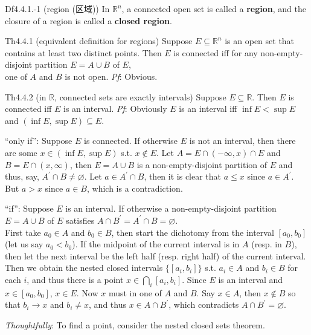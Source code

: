 \documentclass{article}
\begin{document}
\begin{Df}{Df4.4.1.-1 (region (区域))}
    In $\mathbb{R}^n$, a connected open set is called a \textbf{region}, and the closure of a region is called a \textbf{closed region}.
\end{Df}

\begin{Th}{Th4.4.1 (equivalent definition for regions)}
    Suppose $E\subseteq\mathbb{R}^n$ is an open set that contains at least two distinct points. Then $E$ is connected iff for any non-empty-disjoint partition $E = A\cup B$ of $E$, \\
    one of $A$ and $B$ is not open.
    \tcblower
    \textit{Pf}: Obvious.
\end{Th}

\begin{Th}{Th4.4.2 (in $\mathbb{R}$, connected sets are exactly intervals)}
    Suppose $E\subseteq\mathbb{R}$. Then $E$ is connected iff $E$ is an interval.
    \tcblower
    \textit{Pf}: Obviously \textcolor{Th}{$E$ is an interval iff $\inf E<\sup E$ and $(\inf E, \sup E)\subseteq E$}.
    \begin{compactenum}
        \item ``only if'': Suppose $E$ is connected. If otherwise $E$ is not an interval, then there are some $x\in (\inf E, \sup E)$ s.t. $x\notin E$. Let $A = E\cap (-\infty, x)\cap E$ and $B = E\cap (x, \infty)$, then $E = A\cup B$ is a non-empty-disjoint partition of $E$ and thus, say, $A^\prime\cap B\neq\varnothing$. Let $a\in A^\prime\cap B$, then it is clear that $a\leq x$ since $a\in A^\prime$. But $a>x$ since $a\in B$, which is a contradiction.
        \item ``if'': Suppose $E$ is an interval. If otherwise a non-empty-disjoint partition $E = A\cup B$ of $E$ satisfies $A\cap B^\prime = A^\prime\cap B = \varnothing$. \\ 
        First take $a_0\in A$ and $b_0\in B$, then start the dichotomy from the interval $[a_0, b_0]$ (let us say $a_0<b_0$). If the midpoint of the current interval is in $A$ (resp. in $B$), then let the next interval be the left half (resp. right half) of the current interval. Then we obtain the nested closed intervals $\{[a_i, b_i]\}$ s.t. $a_i\in A$ and $b_i\in B$ for each $i$, and thus there is a point $x\in\bigcap_i [a_i, b_i]$. Since $E$ is an interval and $x\in [a_0, b_0]$, $x\in E$. Now $x$ must in one of $A$ and $B$. Say $x\in A$, then $x\notin B$ so that $b_i\rightarrow x$ and $b_i\neq x$, and thus $x\in A\cap B^\prime$, which contradicts $A\cap B^\prime = \varnothing$.
    \end{compactenum}
    \textcolor{P}{\textit{Thoughtfully}: To find a point, consider the nested closed sets theorem.}
\end{Th}
\end{document}
